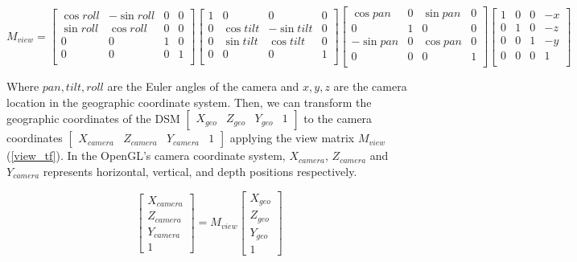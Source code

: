 \documentclass{article}
\begin{document}
\label{view_matrix}
\begin{equation}
  M_{view} = 
  \begin{bmatrix}
    \cos roll & -\sin roll & 0 & 0 \\
    \sin roll & \cos roll & 0 & 0 \\
    0 & 0 & 1 & 0 \\
    0 & 0 & 0 & 1 \\
  \end{bmatrix}
  \begin{bmatrix}
    1 & 0 & 0 & 0 \\
    0 & \cos tilt & -\sin tilt & 0 \\
    0 & \sin tilt & \cos tilt & 0 \\
    0 & 0 & 0 & 1 \\
  \end{bmatrix}
  \begin{bmatrix}
    \cos pan & 0 & \sin pan & 0 \\
    0 & 1 & 0 & 0 \\
    -\sin pan & 0 & \cos pan & 0 \\
    0 & 0 & 0 & 1 \\
  \end{bmatrix}
  \begin{bmatrix}
    1 & 0 & 0 & -x \\
    0 & 1 & 0 & -z \\
    0 & 0 & 1 & -y \\
    0& 0 & 0 & 1 \\
  \end{bmatrix}
\end{equation}

Where \(pan, tilt, roll\) are the Euler angles of the camera and \(x, y, z\) are the camera location in the geographic coordinate system. Then, we can transform the geographic coordinates of the DSM \(\begin{bmatrix} X_{geo} & Z_{geo} & Y_{geo} & 1 \end{bmatrix}\) to the camera coordinates \(\begin{bmatrix} X_{camera} & Z_{camera} & Y_{camera} & 1 \end{bmatrix}\) applying the view matrix \(M_{view}\) (\ref{view_tf}). In the OpenGL's camera coordinate system, \(X_{camera}\), \(Z_{camera}\) and \(Y_{camera}\) represents horizontal, vertical, and depth positions respectively.

\label{view_tf}
\begin{equation}
  \begin{bmatrix} 
    X_{camera} \\ Z_{camera} \\ Y_{camera} \\ 1 
  \end{bmatrix}
  =
  M_{view}
  \begin{bmatrix} 
    X_{geo} \\ Z_{geo} \\ Y_{geo} \\ 1 
  \end{bmatrix}
\end{equation}
\end{document}
